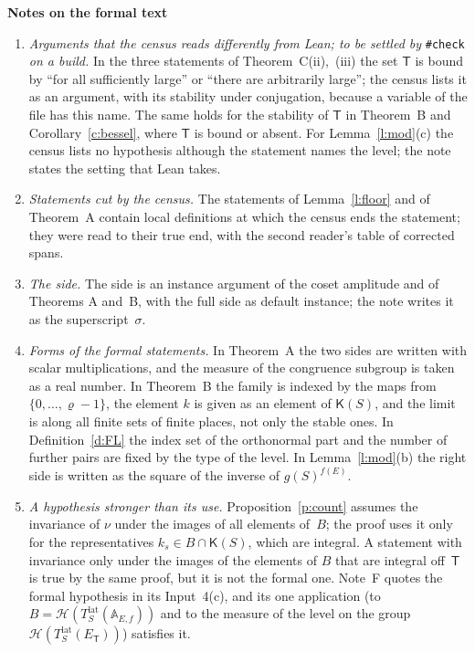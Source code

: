 \documentclass[11pt,a4paper]{article}
\newcommand{\m}[1]{\mbox{$#1$}}        %
\newcommand{\sect}[2]{\refstepcounter{section}\label{#2}\par\addvspace{19pt plus 4pt minus 2pt}\Needspace{7\baselineskip}%
  \noindent\llap{{\fontsize{13.2}{16}\selectfont\bfseries\color{inkfaint}\thesection}\hspace{9pt}}%
  {\fontsize{13.2}{16}\selectfont\bfseries\color{ink}#1}\par\nopagebreak\vspace{-1pt}}
\theoremstyle{plainx}
\theoremstyle{uprightx}
\newcommand{\sT}{\mathsf{T}}                        %
\newcommand{\AEf}{\mathbb{A}_{E,f}}
\newcommand{\ninf}[1]{f(#1)}                        %
\newcommand{\ET}[1]{E_{#1}}                         %
\newcommand{\gS}[1]{g(#1)}                          %
\newcommand{\Tlat}[2]{T^{\mathrm{lat}}_{#1}(#2)}    %
\newcommand{\KS}[1]{\mathsf{K}(#1)}                          %
\newcommand{\HT}[1]{\mathcal{H}(#1)}                %
\begin{document}
\sect{Notes on the formal text}{s:notes}
\begin{enumerate}[leftmargin=1.6em,itemsep=3pt]
\item \emph{Arguments that the census reads differently from Lean; to be settled by} \texttt{\#check} \emph{on a
build.} In the three statements of Theorem~C(ii),~(iii) the set $\sT$ is bound by ``for all sufficiently
large'' or ``there are arbitrarily large''; the census lists it as an argument, with its stability under
conjugation, because a variable of the file has this name. The same holds for the stability of $\sT$ in
Theorem~B and Corollary~\ref{c:bessel}, where $\sT$ is bound or absent. For Lemma~\ref{l:mod}(c) the census lists
no hypothesis although the statement names the level; the note states the setting that Lean takes.
\item \emph{Statements cut by the census.} The statements of Lemma~\ref{l:floor} and of Theorem~A contain local
definitions at which the census ends the statement; they were read to their true end, with the second
reader's table of corrected spans.
\item \emph{The side.} The side is an instance argument of the coset amplitude and of Theorems A and~B, with
the full side as default instance; the note writes it as the superscript~$\sigma$.
\item \emph{Forms of the formal statements.} In Theorem~A the two sides are written with scalar
multiplications, and the measure of the congruence subgroup is taken as a real number. In Theorem~B the family
is indexed by the maps from \m{\{0,\dots,\varrho-1\}}, the element $k$ is given as an element of \m{\KS{S}}, and the
limit is along all finite sets of finite places, not only the stable ones. In Definition~\ref{d:FL} the index
set of the orthonormal part and the number of further pairs are fixed by the type of the level. In
Lemma~\ref{l:mod}(b) the right side is written as the square of the inverse of \m{\gS{S}^{\ninf{E}}}.
\item \emph{A hypothesis stronger than its use.} Proposition~\ref{p:count} assumes the invariance of $\nu$ under
the images of all elements of~$B$; the proof uses it only for the representatives \m{k_s\in B\cap\KS{S}}, which
are integral. A statement with invariance only under the images of the elements of $B$ that are integral
off~$\sT$ is true by the same proof, but it is not the formal one. Note~F quotes the formal hypothesis in its
Input~4(c), and its one application (to \m{B=\HT{\Tlat{S}{\AEf}}} and to the measure of the level on the group
\m{\HT{\Tlat{S}{\ET{\sT}}}}) satisfies it.

\end{enumerate}
\end{document}
